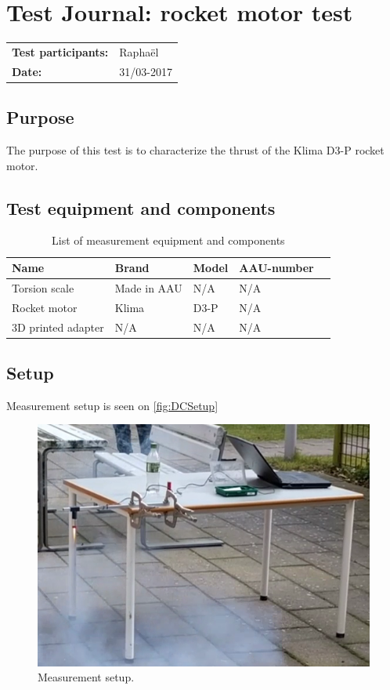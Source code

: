 \graphicspath{{figures/design/}}
\chapter{Test Journal: rocket motor test}
\label{ssc:ThrusterTest}
\begin{table}[!h]
\begin{tabular}{l l}
\textbf{Test participants:} & Raphaël  \\
\textbf{Date:}  & 31/03-2017
\end{tabular}
\end{table}

\section*{Purpose}
The purpose of this test is to characterize the thrust of the Klima D3-P rocket motor.
\section*{Test equipment and components}
\begin{table}[h]
	\centering
	\caption{List of measurement equipment and components}\label{tab_appendix:SRB_equip}

	\begin{tabularx}{\textwidth}{lXXXX}
		Name 				& Brand	& Model & AAU-number									\\ \toprule \rowcolor{lightGrey}
		Torsion scale	& Made in AAU & N/A & N/A 	\\
		Rocket motor	& Klima &  D3-P & N/A \\ \rowcolor{lightGrey}
		3D printed adapter & N/A & N/A & N/A
	\end{tabularx}
\end{table}
\section*{Setup}
Measurement setup is seen on \autoref{fig:DCSetup} \
\begin{figure} [h]
\centering
\includegraphics[width=0.8\linewidth]{figures/appendix/srb_test_setup.png}
\caption{Measurement setup.}
\label{fig:SRBSetup}
\end{figure}

